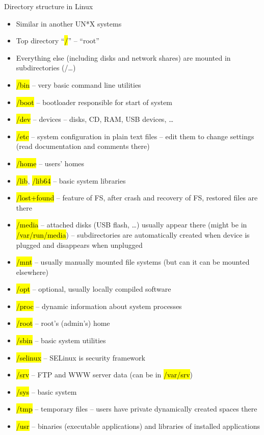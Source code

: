 \documentclass[compress, ucs, xelatex, 11pt, xcolor=svgnames,
  hyperref={
    bookmarks=true,
    unicode=true,
    colorlinks=true,
    pdftitle={Linux, command line and MetaCentrum},
    plainpages=false,
    pdfauthor={Vojtech Zeisek},
    pdfsubject={Course about use of Linux command line, writing shell scripts and using MetaCentrum of CESNET},
    pdfcreator={XeLaTeX},
    pdfkeywords={Linux, GNU, BASH, shell, command line, MetaCentrum},
    linkcolor=Red,
    anchorcolor=Blue,
    citecolor=Purple,
    filecolor=DodgerBlue,
    menucolor=DarkOrchid,
    urlcolor=DeepSkyBlue,
    pdftex},
  url={hyphens, lowtilde} %
  ]{beamer}
\renewcommand{\texttt}[1]{\hl{\ttfamily #1}}
\begin{document}
\begin{frame}[allowframebreaks]{Directory structure in Linux}
\begin{itemize}
  \item Similar in another UN*X systems
  \item Top directory ``\texttt{/}'' -- ``root''
  \item Everything else (including disks and network shares) are mounted in subdirectories (/\ldots)
  \item \texttt{/bin} -- very basic command line utilities
  \item \texttt{/boot} -- bootloader responsible for start of system
  \item \texttt{/dev} -- devices -- disks, CD, RAM, USB devices, \ldots
  \item \alert{\texttt{/etc}} -- system configuration in plain text files -- edit them to change settings (read documentation and comments there)
  \item \alert{\texttt{/home}} -- users' homes
  \item \texttt{/lib}, \texttt{/lib64} -- basic system libraries
  \item \texttt{/lost+found} -- feature of FS, after crash and recovery of FS, restored files are there
  \item \alert{\texttt{/media}} -- attached disks (USB flash, \ldots) usually appear there (might be in \texttt{/var/run/media}) -- subdirectories are automatically created when device is plugged and disappears when unplugged
  \item \texttt{/mnt} -- usually manually mounted file systems (but can it can be mounted elsewhere)
  \item \texttt{/opt} -- optional, usually locally compiled software
  \item \texttt{/proc} -- dynamic information about system processes
  \item \texttt{/root} -- root's (admin's) home
  \item \texttt{/sbin} -- basic system utilities
  \item \texttt{/selinux} -- SELinux is security framework
  \item \texttt{/srv} -- FTP and WWW server data (can be in \texttt{/var/srv})
  \item \texttt{/sys} -- basic system
  \item \texttt{/tmp} -- temporary files -- users have private dynamically created spaces there
  \item \texttt{/usr} -- binaries (executable applications) and libraries of installed applications

\end{itemize}
\end{frame}
\end{document}
